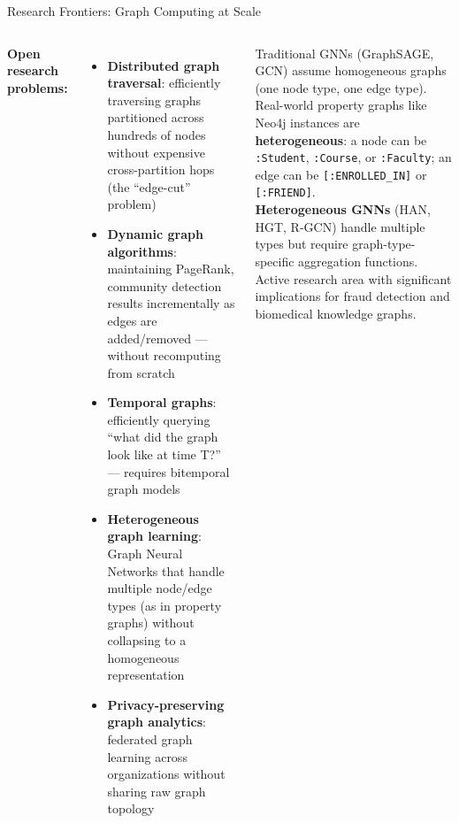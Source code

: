 \documentclass[aspectratio=169]{beamer}
\begin{document}
\begin{frame}{Research Frontiers: Graph Computing at Scale}
  \begin{columns}[T]
      \small
      \textbf{Open research problems:}
      \begin{itemize}
        \item \textbf{Distributed graph traversal}: efficiently traversing graphs partitioned across hundreds of nodes without expensive cross-partition hops (the ``edge-cut'' problem)
        \item \textbf{Dynamic graph algorithms}: maintaining PageRank, community detection results incrementally as edges are added/removed — without recomputing from scratch
        \item \textbf{Temporal graphs}: efficiently querying ``what did the graph look like at time T?'' — requires bitemporal graph models
        \item \textbf{Heterogeneous graph learning}: Graph Neural Networks that handle multiple node/edge types (as in property graphs) without collapsing to a homogeneous representation
        \item \textbf{Privacy-preserving graph analytics}: federated graph learning across organizations without sharing raw graph topology
      \end{itemize}
      \begin{tcolorbox}[deepdivebox, title={Research Context: GNN on Property Graphs}]
        \scriptsize
        Traditional GNNs (GraphSAGE, GCN) assume homogeneous graphs (one node type, one edge type). Real-world property graphs like Neo4j instances are \textbf{heterogeneous}: a node can be \texttt{:Student}, \texttt{:Course}, or \texttt{:Faculty}; an edge can be \texttt{[:ENROLLED\_IN]} or \texttt{[:FRIEND]}.
        \vspace{0.1cm}\\
        \textbf{Heterogeneous GNNs} (HAN, HGT, R-GCN) handle multiple types but require graph-type-specific aggregation functions. Active research area with significant implications for fraud detection and biomedical knowledge graphs.
      \end{tcolorbox}
  \end{columns}
\end{frame}

\end{document}
